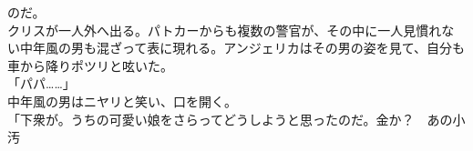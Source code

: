 \documentclass[b5j,10pt,openany]{jsbook}
\begin{document}
のだ。\\クリスが一人外へ出る。パトカーからも複数の警官が、その中に一人見慣れない中年風の男も混ざって表に現れる。アンジェリカはその男の姿を見て、自分も車から降りポツリと呟いた。\\「パパ\ldots{}\ldots{}」\\中年風の男はニヤリと笑い、口を開く。\\「下衆が。うちの可愛い娘をさらってどうしようと思ったのだ。金か？　あの小汚
\end{document}
